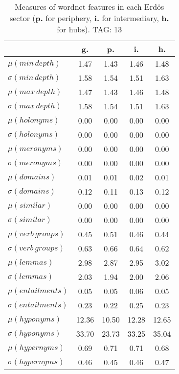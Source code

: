 \begin{table}[h!]
\begin{center}
\begin{tabular}{| l || c | c | c | c |}\hline
 & {\bf g.} & {\bf p.} & {\bf i.} & {\bf h.} \\\hline\hline
$\mu(min\,depth)$ & 1.47  & 1.43  & 1.46  & 1.48 \\
$\sigma(min\,depth)$ & 1.58  & 1.54  & 1.51  & 1.63 \\\hline
$\mu(max\,depth)$ & 1.47  & 1.43  & 1.46  & 1.48 \\
$\sigma(max\,depth)$ & 1.58  & 1.54  & 1.51  & 1.63 \\\hline
$\mu(holonyms)$ & 0.00  & 0.00  & 0.00  & 0.00 \\
$\sigma(holonyms)$ & 0.00  & 0.00  & 0.00  & 0.00 \\\hline
$\mu(meronyms)$ & 0.00  & 0.00  & 0.00  & 0.00 \\
$\sigma(meronyms)$ & 0.00  & 0.00  & 0.00  & 0.00 \\\hline
$\mu(domains)$ & 0.01  & 0.01  & 0.02  & 0.01 \\
$\sigma(domains)$ & 0.12  & 0.11  & 0.13  & 0.12 \\\hline
$\mu(similar)$ & 0.00  & 0.00  & 0.00  & 0.00 \\
$\sigma(similar)$ & 0.00  & 0.00  & 0.00  & 0.00 \\\hline
$\mu(verb\,groups)$ & 0.45  & 0.51  & 0.46  & 0.44 \\
$\sigma(verb\,groups)$ & 0.63  & 0.66  & 0.64  & 0.62 \\\hline
$\mu(lemmas)$ & 2.98  & 2.87  & 2.95  & 3.02 \\
$\sigma(lemmas)$ & 2.03  & 1.94  & 2.00  & 2.06 \\\hline
$\mu(entailments)$ & 0.05  & 0.05  & 0.06  & 0.05 \\
$\sigma(entailments)$ & 0.23  & 0.22  & 0.25  & 0.23 \\\hline
$\mu(hyponyms)$ & 12.36  & 10.50  & 12.28  & 12.65 \\
$\sigma(hyponyms)$ & 33.70  & 23.73  & 33.25  & 35.04 \\\hline
$\mu(hypernyms)$ & 0.69  & 0.71  & 0.71  & 0.68 \\
$\sigma(hypernyms)$ & 0.46  & 0.45  & 0.46  & 0.47 \\\hline
\end{tabular}
\caption{Measures of wordnet features in each Erd\"os sector ({{\bf p.}} for periphery, {{\bf i.}} for intermediary, {{\bf h.}} for hubs). TAG: 13}
\end{center}
\end{table}